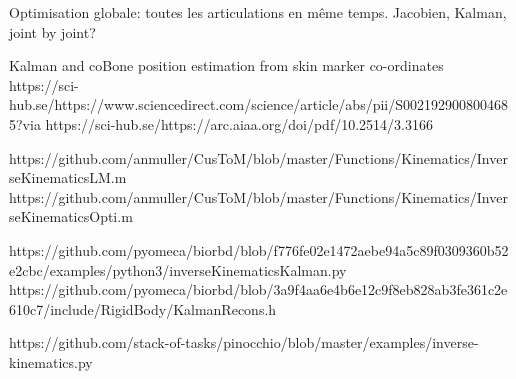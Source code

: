 





Optimisation globale: toutes les articulations en même temps. Jacobien, Kalman, joint by joint?





Kalman and coBone position estimation from skin marker co-ordinates 
https://sci-hub.se/https://www.sciencedirect.com/science/article/abs/pii/S0021929008004685?via%
https://sci-hub.se/https://arc.aiaa.org/doi/pdf/10.2514/3.3166


https://github.com/anmuller/CusToM/blob/master/Functions/Kinematics/InverseKinematicsLM.m 
https://github.com/anmuller/CusToM/blob/master/Functions/Kinematics/InverseKinematicsOpti.m

https://github.com/pyomeca/biorbd/blob/f776fe02e1472aebe94a5c89f0309360b52e2cbc/examples/python3/inverseKinematicsKalman.py
https://github.com/pyomeca/biorbd/blob/3a9f4aa6e4b6e12c9f8eb828ab3fe361c2e610c7/include/RigidBody/KalmanRecons.h

https://github.com/stack-of-tasks/pinocchio/blob/master/examples/inverse-kinematics.py









